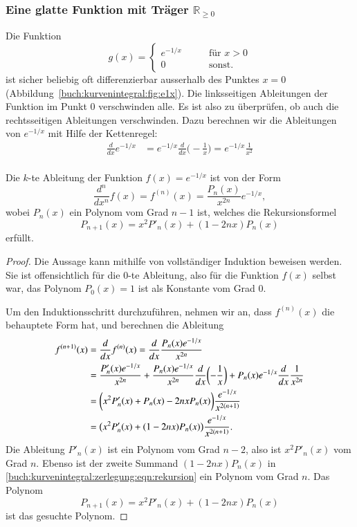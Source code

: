 \subsubsection{Eine glatte Funktion mit Träger $\mathbb{R}_{\ge 0}$}
%
Die Funktion
\[
g(x)
=
\begin{cases}
e^{-1/x}&\qquad \text{für $x>0$}\\
0       &\qquad \text{sonst.}
\end{cases}
\]
ist sicher beliebig oft differenzierbar ausserhalb des Punktes $x=0$
(Abbildung~\ref{buch:kurvenintegral:fig:e1x}).
Die linksseitigen Ableitungen der Funktion im Punkt $0$ verschwinden
alle.
Es ist also zu überprüfen, ob auch die rechtsseitigen Ableitungen
verschwinden.
Dazu berechnen wir die Ableitungen von $e^{-1/x}$ mit Hilfe der
Kettenregel:
\begin{align*}
\frac{d}{dx}e^{-1/x}
&=
e^{-1/x}\frac{d}{dx}\biggl(-\frac1x\biggr)
=
e^{-1/x}\frac{1}{x^2}
\\
\end{align*}

%

\begin{satz}
Die $k$-te Ableitung der Funktion $f(x)=e^{-1/x}$ ist von der Form
\[
\frac{d^n}{dx^n}f(x)
=
f^{(n)}(x)
=
\frac{P_n(x)}{x^{2n}}e^{-1/x},
\]
wobei $P_n(x)$ ein Polynom vom Grad $n-1$ ist, welches die
Rekursionsformel
\[
P_{n+1}(x)
=
x^2P'_n(x) + (1-2nx)P_n(x)
\]
erfüllt.
\end{satz}

\begin{proof}
Die Aussage kann mithilfe von vollständiger Induktion beweisen
werden.
Sie ist offensichtlich für die $0$-te Ableitung, also für die Funktion
$f(x)$ selbst war, das Polynom $P_0(x)=1$ ist als Konstante vom Grad 0.

Um den Induktionsschritt durchzuführen, nehmen wir an, dass $f^{(n)}(x)$
die behauptete Form hat, und berechnen die Ableitung
\begin{align}
f^{(n+1)}(x)
&=
\frac{d}{dx}
f^{(n)}(x)
=
\frac{d}{dx}
\frac{P_n(x) e^{-1/x}}{x^{2n}}
\notag
\\
&=
\frac{P'_n(x)e^{-1/x}}{x^{2n}}
+
\frac{P_n(x)e^{-1/x}}{x^{2n}}\frac{d}{dx}\biggl(-\frac1x\biggr)
+
P_n(x)e^{-1/x}\frac{d}{dx}\frac{1}{x^{2n}}
\notag
\\
&=
\biggl(
x^2 P'_n(x)
+
P_n(x)
-
2nx P_n(x)
\biggr)\frac{e^{-1/x}}{x^{2(n+1)}}
\notag
\\
&=
\bigl(x^2P'_n(x)+(1-2nx)P_n(x)\bigr) \frac{e^{-1/x}}{x^{2(n+1)}}.
\label{buch:kurvenintegral:zerlegung:eqn:rekursion}
\end{align}
Die Ableitung $P'_n(x)$ ist ein Polynom vom Grad $n-2$, also ist
$x^2P'_n(x)$ vom Grad $n$.
Ebenso ist der zweite Summand $(1-2nx)P_n(x)$ in
\eqref{buch:kurvenintegral:zerlegung:eqn:rekursion}
ein Polynom vom Grad $n$.
Das Polynom
\[
P_{n+1}(x)
=
x^2P'_{n}(x)+(1-2nx)P_n(x)
\]
ist das gesuchte Polynom.
\end{proof}

